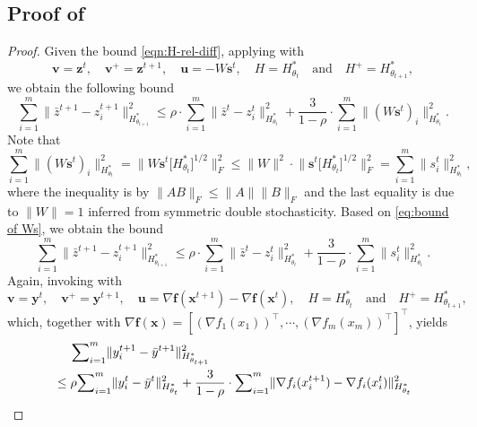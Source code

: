 \documentclass{article}
\theoremstyle{plain}
\theoremstyle{definition}
\theoremstyle{remark}
\newcommand{\bv}{\mathbf{v}}
\newcommand{\bu}{\mathbf{u}}
\newcommand{\bs}{\mathbf{s}}
\newcommand{\bx}{\mathbf{x}}
\newcommand{\by}{\mathbf{y}}
\newcommand{\bz}{\mathbf{z}}
\newcommand{\bff}{\mathbf{f}}
\begin{document}
\subsection{Proof of \texorpdfstring{}{Lemma }}\label{proof of lem:consensus errors}
\begin{proof}
Given the bound \eqref{eqn:H-rel-diff}, applying  with
    \[
    \bv=\bz^t,\quad  \bv^+=\bz^{t+1},\quad \bu=-W\bs^t,\quad H=H^*_{\theta_t} \quad  \text{and} \quad  H^+=H_{\theta_{t+1}}^*,
    \]
    we obtain the following bound 
    \[
    {\sum}_{i=1}^m \|\bar z^{t+1} - z_i^{t+1}\|_{H_{\theta_{t+1}}^*}^2 \leq \rho \cdot {\sum}_{i=1}^m \|\bar z^{t} - z_i^{t}\|_{H_{\theta_{t}}^*}^2 + \frac{3}{1-\rho} \cdot {\sum}_{i=1}^m\|(W\bs^t)_i\|_{H_{\theta_t}^*}^2.
    \]
Note that 
\begin{equation}
\label{eq:bound of Ws}
   {\sum}_{i=1}^m\|(W\bs^t)_i\|_{H_{\theta_t}^*}^2 = \Big\|W\bs^t\big[H^*_{\theta_t}\big]^{1/2}\Big\|_F^2 \leq \|W\|^2 \cdot \Big\|\bs^t\big[H^*_{\theta_t}\big]^{1/2}\Big\|_F^2 = {\sum}_{i=1}^m
\|s^t_i\|_{H_{\theta_t}^*}^2,
\end{equation}
where the inequality is by $\|AB\|_F \leq \|A\| \|B\|_F$ and the last equality is due to $\|W\|=1$ inferred from symmetric double stochasticity. 
Based on \eqref{eq:bound of Ws}, we obtain the bound
\begin{equation}\label{eq:consensus z}
         {\sum}_{i=1}^m \|\bar z^{t+1} - z_i^{t+1}\|_{H_{\theta_{t+1}}^*}^2 
 \leq \rho \cdot {\sum}_{i=1}^m \|\bar z^{t} - z_i^{t}\|_{H_{\theta_{t}}^*}^2 + \frac{3}{1-\rho} \cdot {\sum}_{i=1}^m
\|s^t_i\|_{H_{\theta_t}^*}^2.
\end{equation}  
Again, invoking  with
    \[
    \bv=\by^t,\quad  \bv^+=\by^{t+1},\quad \bu=\nabla \bff(\bx^{t+1}) - \nabla \bff(\bx^{t}),\quad H=H^*_{\theta_t} \quad  \text{and} \quad  H^+=H_{\theta_{t+1}}^*,
    \]
    which, together with $\nabla \bff(\bx)=[(\nabla f_1(x_1))^\top,\cdots,(\nabla f_m(x_m))^\top]^\top$, yields
  \begin{equation}
        \label{eq:consensus bound for y 1}
        \begin{aligned}
       &\hspace{5mm} {\sum}_{i=1}^m\|y_i^{t+1} - \bar y^{t+1}\|^2_{H_{\theta_{t+1}}^*}\\ 
       &\leq \rho  {\sum}_{i=1}^m\|y_i^t - \bar y^t\|^2_{H_{\theta_t}^*} + \frac{3}{1-\rho}\cdot {\sum}_{i=1}^m \|\nabla f_i(x_i^{t+1})-\nabla f_i(x_i^t)\|_{H^*_{\theta_t}}^2\\

\end{aligned}
\end{equation}
\end{proof}
\end{document}
